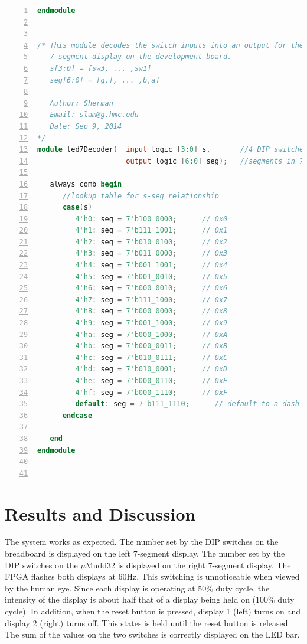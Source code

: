 \documentclass[11pt]{article}
\begin{document}
\begin{lstlisting}[language=Verilog,numbers=left,basicstyle=\footnotesize]
endmodule


/* This module decodes the switch inputs into an output for the 
   7 segment display on the development board.
   s[3:0] = [sw3, ... ,sw1]
   seg[6:0] = [g,f, ... ,b,a]
   
   Author: Sherman
   Email: slam@g.hmc.edu
   Date: Sep 9, 2014
*/
module led7Decoder(  input logic [3:0] s,       //4 DIP switches
                     output logic [6:0] seg);   //segments in 7-seg display
                     
   always_comb begin
      //lookup table for s-seg relationship
      case(s)
         4'h0: seg = 7'b100_0000;      // 0x0
         4'h1: seg = 7'b111_1001;      // 0x1
         4'h2: seg = 7'b010_0100;      // 0x2
         4'h3: seg = 7'b011_0000;      // 0x3
         4'h4: seg = 7'b001_1001;      // 0x4
         4'h5: seg = 7'b001_0010;      // 0x5
         4'h6: seg = 7'b000_0010;      // 0x6
         4'h7: seg = 7'b111_1000;      // 0x7
         4'h8: seg = 7'b000_0000;      // 0x8
         4'h9: seg = 7'b001_1000;      // 0x9
         4'ha: seg = 7'b000_1000;      // 0xA
         4'hb: seg = 7'b000_0011;      // 0xB
         4'hc: seg = 7'b010_0111;      // 0xC
         4'hd: seg = 7'b010_0001;      // 0xD
         4'he: seg = 7'b000_0110;      // 0xE
         4'hf: seg = 7'b000_1110;      // 0xF
         default: seg = 7'b111_1110;      // default to a dash
      endcase
      
   end
endmodule



\end{lstlisting}


\clearpage

\section{Results and Discussion}

The system works as expected. The number set by the DIP switches on the breadboard is displayed on the left 7-segment display. The number set by the DIP switches on the $\mu$Mudd32 is displayed on the right 7-segment display. The FPGA flashes both displays at 60Hz. This switching is unnoticeable when viewed by the human eye. Since each display is operating at 50$\%$ duty cycle, the intensity of the display is about half that of a display being held on (100$\%$ duty cycle). In addition, when the reset button is pressed, display 1 (left) turns on and display 2 (right) turns off. This states is held until the reset button is released. The sum of the values on the two switches is correctly displayed on the LED bar. \\
\end{document}
